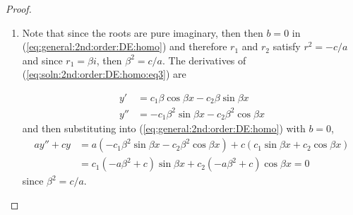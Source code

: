 \begin{proof}
\begin{enumerate}
\item Note that since the roots are pure imaginary, then then $b=0$ in (\ref{eq:general:2nd:order:DE:homo}) and therefore $r_1$ and $r_2$ satisfy $r^2=-c/a$ and since $r_1=\beta i$, then $\beta^2=c/a$.  The derivatives of (\ref{eq:soln:2nd:order:DE:homo:eq3}) are

\begin{align*}
y' & = c_1 \beta \cos \beta x - c_2 \beta \sin \beta x \\
y'' & = - c_1 \beta^2 \sin \beta x  -c_2 \beta^2 \cos \beta x 
\end{align*}
and then substituting into (\ref{eq:general:2nd:order:DE:homo}) with $b=0$, 
%
\begin{align*}
ay'' + c y & = a (-c_1 \beta^2 \sin \beta x - c_2 \beta^2 \cos \beta x)  + c ( c_1 \sin \beta x  +c_2 \cos \beta x ) \\
& = c_1 (-a\beta^2  + c) \sin \beta x + c_2 (-a\beta^2 +c) \cos \beta x =0
\end{align*}
since $\beta^2=c/a$.  




\end{enumerate}
\end{proof}
